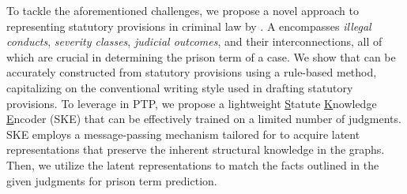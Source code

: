 
To tackle the aforementioned challenges, we propose a novel approach to representing statutory provisions in criminal law by \emph{}. A \lawgraph{} encompasses \textit{illegal conducts}, \textit{severity classes}, \textit{judicial outcomes}, and their interconnections, all of which are crucial in determining the prison term of a case. We show that  can be accurately constructed from statutory provisions using a rule-based method, capitalizing on the conventional writing style used in drafting statutory provisions. To leverage  in PTP, we propose a lightweight \underline{S}tatute \underline{K}nowledge \underline{E}ncoder (SKE) that can be effectively trained on a limited number of judgments. SKE employs a message-passing mechanism tailored for  to acquire latent representations that preserve the inherent structural knowledge in the graphs. Then, we utilize the latent representations to match the facts outlined in the given judgments for prison term prediction. 

